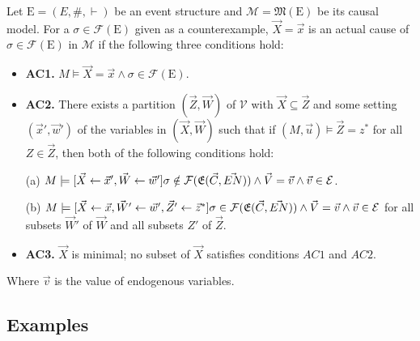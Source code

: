 \begin{definition}
    Let $\mathrm{E} = (E,\#,\vdash)$ be an event structure and
    $\mathcal{M} = \mathfrak{M}(\mathrm{E})$ be its causal model.
    For a $\sigma \in \mathcal{F}(\mathrm{E})$ given as a counterexample,
    $\vec X = \vec x$ is an actual cause of
    $\sigma \in \mathcal{F}(\mathrm{E})$ in $\mathcal{M}$ if the following three conditions hold:
    \begin{itemize}
        \item  \textbf{AC1.} $M\models \vec X = \vec x
                  \wedge \sigma \in \mathcal{F}(\mathrm{E})$.
        \item  \textbf{AC2. }There exists a partition $(\vec Z, \vec W)$ of $\mathcal{V}$ with $\vec X \subseteq \vec Z$ and some setting $(\vec x',\vec w')$ of the variables in $(\vec X,\vec W)$ such that if $(M,\vec u)\models \vec Z = z^*$ for all $Z\in \vec Z$, then both of the following conditions hold:

              (a) $M \models[\vec X \leftarrow \vec x', \vec W \leftarrow \vec w']
                  \sigma \notin \mathcal{F}(\mathfrak{E}(\vec C,\vec {EN}))
                  \wedge \vec V = \vec v
                  \wedge  \vec v \in \mathcal{E}$.

              (b) $M \models[\vec X\leftarrow \vec x, \vec W' \leftarrow \vec w', \vec Z'\leftarrow \vec z^*]
                  \sigma \in \mathcal{F}(\mathfrak{E}(\vec C,\vec {EN}))
                  \wedge \vec V = \vec v
                  \wedge \vec v \in \mathcal{E}$
              for all subsets $\vec W'$ of $\vec W$ and all subsets $Z'$ of $\vec Z$.

        \item  \textbf{AC3.} $\vec X$ is minimal; no subset of $\vec X$ satisfies conditions $AC1$ and $AC2$.
    \end{itemize}
    Where $\vec v$ is the value of endogenous variables.
\end{definition}
\pagebreak
\subsection{Examples}
